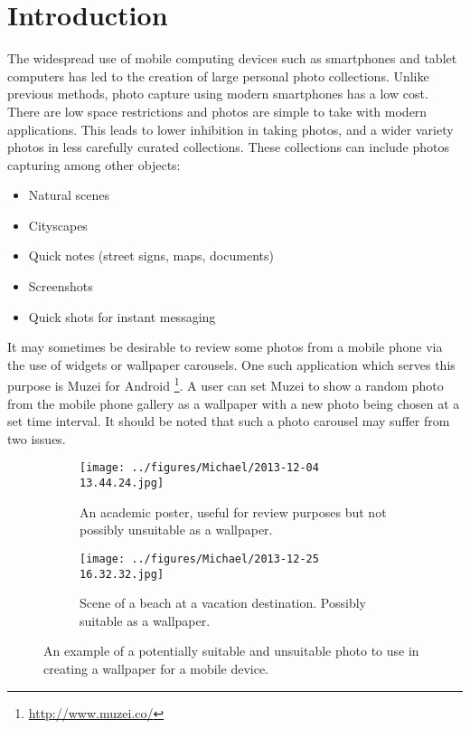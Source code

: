 %


\chapter{Introduction}

The widespread use of mobile computing devices such as smartphones and tablet
computers has led to the creation of large personal photo collections.
Unlike previous methods, photo capture using modern smartphones has a low cost.
There are low space restrictions and photos are simple to take with modern
applications.
This leads to lower inhibition in taking photos, and a wider variety photos in
less carefully curated collections.
These collections can include photos capturing among other objects:

\begin{itemize}
\item Natural scenes
\item Cityscapes
\item Quick notes (street signs, maps, documents)
\item Screenshots
\item Quick shots for instant messaging
\end{itemize}

It may sometimes be desirable to review some photos from a mobile phone via the use of widgets or wallpaper carousels.
One such application which serves this purpose is Muzei for Android \footnote{\url{http://www.muzei.co/}}.
A user can set Muzei to show a random photo from the mobile phone gallery as a wallpaper with a new photo being chosen at a set time interval.
It should be noted that such a photo carousel may suffer from two issues.

\begin{figure}
\centering
\begin{subfigure}{0.46\columnwidth}
  \centering
  \texttt{[image: ../figures/Michael/2013-12-04 13.44.24.jpg]}
  \caption{An academic poster, useful for review purposes but not possibly unsuitable as a wallpaper.}
\end{subfigure}
\hfill
\begin{subfigure}{0.46\columnwidth}
  \centering
  \texttt{[image: ../figures/Michael/2013-12-25 16.32.32.jpg]}
  \caption{Scene of a beach at a vacation destination. Possibly suitable as a wallpaper.}
\end{subfigure}
\caption{An example of a potentially suitable and unsuitable photo to use in creating a wallpaper for a mobile device.\label{fig:good_n_bad_wallpaper}}
\end{figure}

